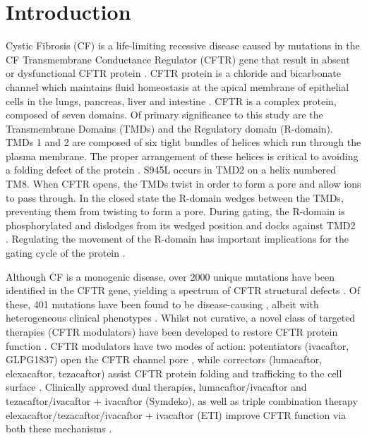 \section{Introduction}
Cystic Fibrosis (CF) is a life-limiting recessive disease \cite{mall2014, elborn2016} caused by mutations in the CF Transmembrane Conductance Regulator (CFTR) gene that result in absent or dysfunctional CFTR protein \cite{rowe2005}. CFTR protein is a chloride and bicarbonate channel \cite{veit2016} which maintains fluid homeostasis at the apical membrane of epithelial cells \cite{riordan1989} in the lungs, pancreas, liver and intestine \cite{ratjen2015}. CFTR is a complex protein, composed of seven domains. Of primary significance to this study are the Transmembrane Domains (TMDs) and the Regulatory domain (R-domain). TMDs 1 and 2 are composed of six tight bundles of helices which run through the plasma membrane. The proper arrangement of these helices is critical to avoiding a folding defect of the protein \cite{fiedorczuk2022}. S945L occurs in TMD2 on a helix numbered TM8. When CFTR opens, the TMDs twist in order to form a pore and allow ions to pass through. In the closed state the R-domain wedges between the TMDs, preventing them from twisting to form a pore. During gating, the R-domain is phosphorylated and dislodges from its wedged position and docks against TMD2 \cite{zhang2018}. Regulating the movement of the R-domain has important implications for the gating cycle of the protein \cite{mihalyi2020}.

Although CF is a monogenic disease, over 2000 unique mutations have been identified in the CFTR gene, yielding a spectrum of CFTR structural defects \cite{deboeck2016}. Of these, 401 mutations have been found to be disease-causing \cite{cftr2}, albeit with heterogeneous clinical phenotypes \cite{bonadia2014}. Whilst not curative, a novel class of targeted therapies (CFTR modulators) have been developed to restore CFTR protein function \cite{awatade2018}. CFTR modulators have two modes of action:  potentiators (ivacaftor, GLPG1837) open the CFTR channel pore \cite{vangoor2009, accurso2010, yu2012, rosenfeld2018}, while correctors (lumacaftor, elexacaftor, tezacaftor) assist CFTR protein folding and trafficking to the cell surface \cite{lopes-pacheco2017, dekkers2016b}. Clinically approved dual therapies, lumacaftor/ivacaftor and tezacaftor/ivacaftor + ivacaftor (Symdeko), as well as triple combination therapy elexacaftor/tezacaftor/ivacaftor + ivacaftor (ETI) improve CFTR function via both these mechanisms \cite{ wainwright2015,rowe2017, middleton2019}. 

